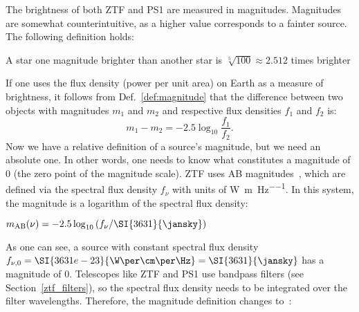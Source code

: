 The brightness of both ZTF and PS1 are measured in magnitudes. Magnitudes are somewhat counterintuitive, as a higher value corresponds to a fainter source. The following definition holds:

\begin{definition}
    A star one magnitude brighter than another star is $\sqrt[5]{100} \approx 2.512$ times brighter
\end{definition}
If one uses the flux density (power per unit area) on Earth as a measure of brightness, it follows from Def.~\ref{def:magnitude} that the difference between two objects with magnitudes $m_1$ and $m_2$ and respective flux densities $f_1$ and $f_2$ is:
\begin{equation}
    m_1 - m_2 = -2.5 \log_{10}{\frac{f_1}{f_2}}.
\end{equation}
Now we have a relative definition of a source's magnitude, but we need an absolute one. In other words, one needs to know what constitutes a magnitude of 0 (the zero point of the magnitude scale). ZTF uses AB magnitudes~, which are defined via the spectral flux density $f_\nu$  with units of \unit{\W\per\m\per\Hz}. In this system, the magnitude is a logarithm of the spectral flux density:

\begin{definition}
    $m_{\text{AB}}(\nu) = -2.5 \log_{10}{(f_\nu/\SI{3631}{\jansky})}$
\end{definition}

As one can see, a source with constant spectral flux density $f_{\nu,0} = \SI{3631e-23}{\W\per\cm\per\Hz} = \SI{3631}{\jansky}$ has a magnitude of 0. Telescopes like ZTF and PS1 use bandpass filters (see Section~\ref{ztf_filters}), so the spectral flux density needs to be integrated over the filter wavelengths. Therefore, the magnitude definition changes to~:

